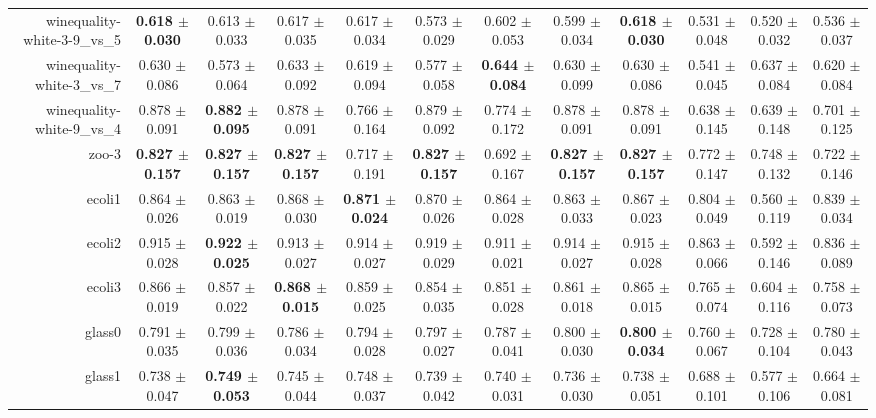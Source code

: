 \begin{table}[!ht]
{\begin{tabular}{r c c c c c c c c c c c}
winequality-white-3-9\_vs\_5 & \textbf{0.618 $\pm$ 0.030} & 0.613 $\pm$ 0.033 & 0.617 $\pm$ 0.035 & 0.617 $\pm$ 0.034 & 0.573 $\pm$ 0.029 & 0.602 $\pm$ 0.053 & 0.599 $\pm$ 0.034 & \textbf{0.618 $\pm$ 0.030} & 0.531 $\pm$ 0.048 & 0.520 $\pm$ 0.032 & 0.536 $\pm$ 0.037 \\
winequality-white-3\_vs\_7 & 0.630 $\pm$ 0.086 & 0.573 $\pm$ 0.064 & 0.633 $\pm$ 0.092 & 0.619 $\pm$ 0.094 & 0.577 $\pm$ 0.058 & \textbf{0.644 $\pm$ 0.084} & 0.630 $\pm$ 0.099 & 0.630 $\pm$ 0.086 & 0.541 $\pm$ 0.045 & 0.637 $\pm$ 0.084 & 0.620 $\pm$ 0.084 \\
winequality-white-9\_vs\_4 & 0.878 $\pm$ 0.091 & \textbf{0.882 $\pm$ 0.095} & 0.878 $\pm$ 0.091 & 0.766 $\pm$ 0.164 & 0.879 $\pm$ 0.092 & 0.774 $\pm$ 0.172 & 0.878 $\pm$ 0.091 & 0.878 $\pm$ 0.091 & 0.638 $\pm$ 0.145 & 0.639 $\pm$ 0.148 & 0.701 $\pm$ 0.125 \\
zoo-3 & \textbf{0.827 $\pm$ 0.157} & \textbf{0.827 $\pm$ 0.157} & \textbf{0.827 $\pm$ 0.157} & 0.717 $\pm$ 0.191 & \textbf{0.827 $\pm$ 0.157} & 0.692 $\pm$ 0.167 & \textbf{0.827 $\pm$ 0.157} & \textbf{0.827 $\pm$ 0.157} & 0.772 $\pm$ 0.147 & 0.748 $\pm$ 0.132 & 0.722 $\pm$ 0.146 \\
ecoli1 & 0.864 $\pm$ 0.026 & 0.863 $\pm$ 0.019 & 0.868 $\pm$ 0.030 & \textbf{0.871 $\pm$ 0.024} & 0.870 $\pm$ 0.026 & 0.864 $\pm$ 0.028 & 0.863 $\pm$ 0.033 & 0.867 $\pm$ 0.023 & 0.804 $\pm$ 0.049 & 0.560 $\pm$ 0.119 & 0.839 $\pm$ 0.034 \\
ecoli2 & 0.915 $\pm$ 0.028 & \textbf{0.922 $\pm$ 0.025} & 0.913 $\pm$ 0.027 & 0.914 $\pm$ 0.027 & 0.919 $\pm$ 0.029 & 0.911 $\pm$ 0.021 & 0.914 $\pm$ 0.027 & 0.915 $\pm$ 0.028 & 0.863 $\pm$ 0.066 & 0.592 $\pm$ 0.146 & 0.836 $\pm$ 0.089 \\
ecoli3 & 0.866 $\pm$ 0.019 & 0.857 $\pm$ 0.022 & \textbf{0.868 $\pm$ 0.015} & 0.859 $\pm$ 0.025 & 0.854 $\pm$ 0.035 & 0.851 $\pm$ 0.028 & 0.861 $\pm$ 0.018 & 0.865 $\pm$ 0.015 & 0.765 $\pm$ 0.074 & 0.604 $\pm$ 0.116 & 0.758 $\pm$ 0.073 \\
glass0 & 0.791 $\pm$ 0.035 & 0.799 $\pm$ 0.036 & 0.786 $\pm$ 0.034 & 0.794 $\pm$ 0.028 & 0.797 $\pm$ 0.027 & 0.787 $\pm$ 0.041 & 0.800 $\pm$ 0.030 & \textbf{0.800 $\pm$ 0.034} & 0.760 $\pm$ 0.067 & 0.728 $\pm$ 0.104 & 0.780 $\pm$ 0.043 \\
glass1 & 0.738 $\pm$ 0.047 & \textbf{0.749 $\pm$ 0.053} & 0.745 $\pm$ 0.044 & 0.748 $\pm$ 0.037 & 0.739 $\pm$ 0.042 & 0.740 $\pm$ 0.031 & 0.736 $\pm$ 0.030 & 0.738 $\pm$ 0.051 & 0.688 $\pm$ 0.101 & 0.577 $\pm$ 0.106 & 0.664 $\pm$ 0.081 \\

\end{tabular}}
\end{table}
